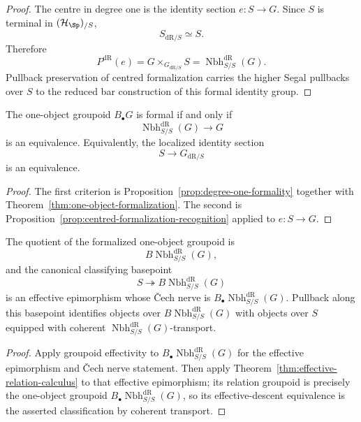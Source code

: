 \begin{proof}
The centre in degree one is the identity section
$e:S\to G$.  Since $S$ is terminal in $(\mathcal H_{\Sp})_{/S}$,
\[
    S_{\mathrm{dR}/S}\simeq S.
\]
Therefore
\[
    P^{\mathrm{dR}}(e)
    =
    G\times_{G_{\mathrm{dR}/S}}S
    =
    \operatorname{Nbh}^{\mathrm{dR}}_{S/S}(G).
\]
Pullback preservation of centred formalization carries the higher Segal
pullbacks over $S$ to the reduced bar construction of this formal identity
group.
\end{proof}

\begin{corollary}
\label{cor:one-object-formality-recognition}
The one-object groupoid $B_\bullet G$ is formal if and only if
\[
    \operatorname{Nbh}^{\mathrm{dR}}_{S/S}(G)
    \longrightarrow
    G
\]
is an equivalence.  Equivalently, the localized identity section
\[
    S
    \longrightarrow
    G_{\mathrm{dR}/S}
\]
is an equivalence.
\end{corollary}

\begin{proof}
The first criterion is
Proposition~\ref{prop:degree-one-formality} together with
Theorem~\ref{thm:one-object-formalization}.  The second is
Proposition~\ref{prop:centred-formalization-recognition} applied to
$e:S\to G$.
\end{proof}

\begin{corollary}
\label{cor:formal-identity-classifying-quotient}
The quotient of the formalized one-object groupoid is
\[
    B\operatorname{Nbh}^{\mathrm{dR}}_{S/S}(G),
\]
and the canonical classifying basepoint
\[
    S\twoheadrightarrow B\operatorname{Nbh}^{\mathrm{dR}}_{S/S}(G)
\]
is an effective epimorphism whose \v{C}ech nerve is
$B_\bullet\operatorname{Nbh}^{\mathrm{dR}}_{S/S}(G)$.  Pullback along this basepoint identifies
objects over $B\operatorname{Nbh}^{\mathrm{dR}}_{S/S}(G)$ with objects over $S$ equipped with
coherent $\operatorname{Nbh}^{\mathrm{dR}}_{S/S}(G)$-transport.
\end{corollary}

\begin{proof}
Apply groupoid effectivity to
$B_\bullet\operatorname{Nbh}^{\mathrm{dR}}_{S/S}(G)$ for the effective epimorphism and \v{C}ech
nerve statement.  Then apply
Theorem~\ref{thm:effective-relation-calculus} to that effective epimorphism;
its relation groupoid is precisely the one-object groupoid
$B_\bullet\operatorname{Nbh}^{\mathrm{dR}}_{S/S}(G)$, so its effective-descent equivalence is
the asserted classification by coherent transport.
\end{proof}

